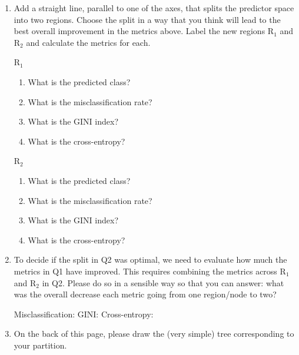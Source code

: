 \documentclass{article}\usepackage[]{graphicx}\usepackage[]{color}
\begin{document}
\begin{enumerate}
\begin{minipage}{.5\linewidth}
\end{minipage}

\item Add a straight line, parallel to one of the axes, that splits the predictor space into two regions. Choose the split in a way that you think will lead to the best overall improvement in the metrics above. Label the new regions $\textrm{R}_1$ and $\textrm{R}_2$ and calculate the metrics for each.

\vspace{5mm}

\begin{minipage}{.5\linewidth}
\begin{center}
$\textrm{R}_1$
\end{center}
\begin{enumerate}
\setlength\itemsep{3em}
\item What is the predicted class?
\item What is the misclassification rate?
\item What is the GINI index?
\item What is the cross-entropy?
\end{enumerate}
\end{minipage}
\begin{minipage}{.5\linewidth}
\begin{center}
$\textrm{R}_2$
\end{center}
\begin{enumerate}
\setlength\itemsep{3em}
\item What is the predicted class?
\item What is the misclassification rate?
\item What is the GINI index?
\item What is the cross-entropy?
\end{enumerate}

\end{minipage}
\item To decide if the split in Q2 was optimal, we need to evaluate how much the metrics in Q1 have improved. This requires combining the metrics across $\textrm{R}_1$ and $\textrm{R}_2$ in Q2. Please do so in a sensible way so that you can answer: what was the overall decrease each metric going from one region/node to two?

Misclassification: \hspace{30mm} GINI: \hspace{30mm} Cross-entropy:

\vspace{5mm}

\item On the back of this page, please draw the (very simple) tree corresponding to your partition.

\end{enumerate}
\end{document}

